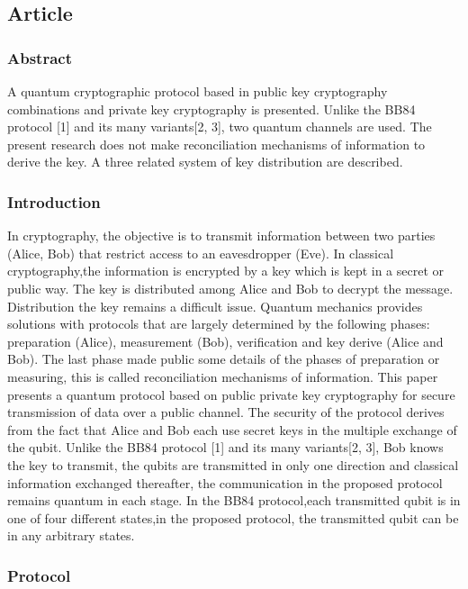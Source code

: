 \subsection{Article}

\subsubsection*{Abstract}
A quantum cryptographic protocol based in public key cryptography combinations and private key cryptography is presented. Unlike the BB84 protocol [1] and its many variants[2, 3], two quantum channels are used. The present research does not make reconciliation mechanisms of information to derive the key. A three related system of key distribution are described.

\subsubsection{Introduction}
In cryptography, the objective is to transmit information between two parties (Alice, Bob) that restrict access to an eavesdropper (Eve). In classical cryptography,the information is encrypted by a key which is kept in a secret or public way. The key is distributed among Alice and Bob to decrypt the message. Distribution the key remains a difficult issue. Quantum mechanics provides solutions with protocols that are largely determined by the following phases: preparation (Alice), measurement (Bob), verification and key derive (Alice and Bob).
The last phase made public some details of the phases of preparation or measuring, this is called reconciliation mechanisms of information.
This paper presents a quantum protocol based on public private key cryptography for secure transmission of data over a public channel. The security of the protocol derives from the fact that Alice and Bob each use secret keys in the multiple exchange of the qubit. Unlike the BB84 protocol [1] and its many variants[2, 3], Bob knows the key to transmit, the qubits are transmitted in only one direction and classical information exchanged thereafter, the communication in the proposed protocol remains quantum in each stage. In the BB84 protocol,each transmitted qubit is in one of four different states,in the proposed protocol, the transmitted qubit can be in any arbitrary states.

\subsubsection{Protocol}

